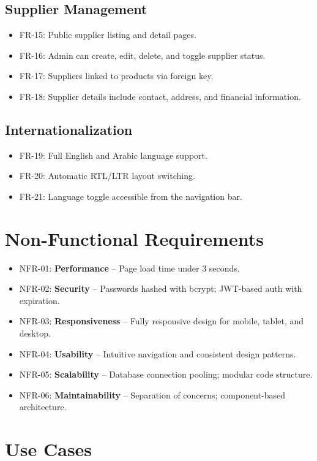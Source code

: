 \documentclass[12pt,a4paper]{report}
\begin{document}
\subsection{Supplier Management}
\begin{itemize}[noitemsep]
  \item FR-15: Public supplier listing and detail pages.
  \item FR-16: Admin can create, edit, delete, and toggle supplier status.
  \item FR-17: Suppliers linked to products via foreign key.
  \item FR-18: Supplier details include contact, address, and financial information.
\end{itemize}

\subsection{Internationalization}
\begin{itemize}[noitemsep]
  \item FR-19: Full English and Arabic language support.
  \item FR-20: Automatic RTL/LTR layout switching.
  \item FR-21: Language toggle accessible from the navigation bar.
\end{itemize}

\section{Non-Functional Requirements}
\begin{itemize}[noitemsep]
  \item NFR-01: \textbf{Performance} -- Page load time under 3 seconds.
  \item NFR-02: \textbf{Security} -- Passwords hashed with bcrypt; JWT-based auth with expiration.
  \item NFR-03: \textbf{Responsiveness} -- Fully responsive design for mobile, tablet, and desktop.
  \item NFR-04: \textbf{Usability} -- Intuitive navigation and consistent design patterns.
  \item NFR-05: \textbf{Scalability} -- Database connection pooling; modular code structure.
  \item NFR-06: \textbf{Maintainability} -- Separation of concerns; component-based architecture.
\end{itemize}

\section{Use Cases}
\end{document}
